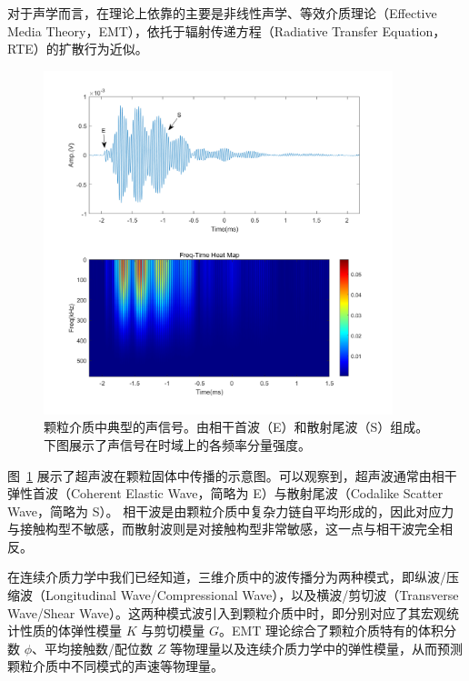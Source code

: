 对于声学而言，在理论上依靠的主要是非线性声学\cite{10.1029/93JB02974}、等效介质理论（Effective Media Theory，EMT）\cite{WALTON1987213}，依托于辐射传递方程（Radiative Transfer Equation，RTE）的扩散行为近似\cite{PhysRevLett.93.154303,PhysRevApplied.16.034009}。

\begin{figure}[!htp]
  \centering
  \includegraphics[height=10cm]{figures/1_heat_map.png}
  \caption{颗粒介质中典型的声信号。由相干首波（E）和散射尾波（S）组成。下图展示了声信号在时域上的各频率分量强度。}
  \label{fig:acoustic_signal}
\end{figure}

图~\ref{fig:acoustic_signal} 展示了超声波在颗粒固体中传播的示意图。可以观察到，超声波通常由相干弹性首波（Coherent Elastic Wave，简略为 E）与散射尾波（Codalike Scatter Wave，简略为 S）。 相干波是由颗粒介质中复杂力链自平均形成的，因此对应力与接触构型不敏感，而散射波则是对接触构型非常敏感，这一点与相干波完全相反\cite{PhysRevLett.93.154303}。

在连续介质力学中我们已经知道，三维介质中的波传播分为两种模式，即纵波/压缩波（Longitudinal Wave/Compressional Wave），以及横波/剪切波（Transverse Wave/Shear Wave）。这两种模式波引入到颗粒介质中时，即分别对应了其宏观统计性质的体弹性模量 $K$ 与剪切模量 $G$。EMT 理论综合了颗粒介质特有的体积分数 $\phi$、平均接触数/配位数 $Z$ 等物理量以及连续介质力学中的弹性模量，从而预测颗粒介质中不同模式的声速等物理量。

